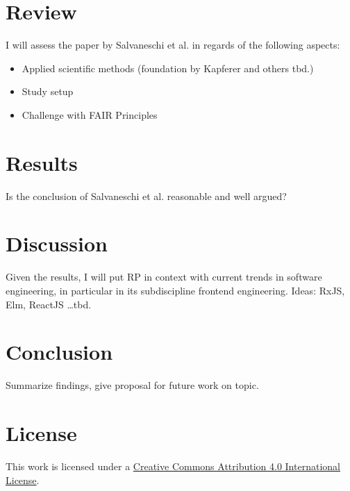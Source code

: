 \documentclass[12pt,a4paper,twocolumn]{article}
\begin{document}
	\section{Review}
	I will assess the paper by Salvaneschi et al. \cite{7827078} in regards of the following aspects:
	\begin{itemize}
		\item Applied scientific methods (foundation by Kapferer \cite{kapferer:2019:empirical} and others tbd.)
		\item Study setup
		\item Challenge with FAIR Principles \cite{2019arXiv190805986H} \cite{wilkinson:2016}
	\end{itemize}

	\section{Results}
	Is the conclusion of Salvaneschi et al. \cite{7827078} reasonable and well argued?

	\section{Discussion}
	Given the results, I will put RP in context with current trends in software engineering, in particular in its subdiscipline frontend engineering.
	Ideas: RxJS, Elm, ReactJS \dots tbd.

	\section{Conclusion}
	Summarize findings, give proposal for future work on topic.

	
	

	\section*{License}
	\ccby\thinspace\thinspace This work is licensed under a \href{https://creativecommons.org/licenses/by/4.0/}{Creative Commons Attribution 4.0 International License}.
\end{document}
